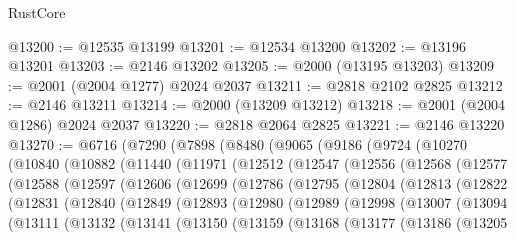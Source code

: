 \begin{lexlean}{RustCore}
\begin{coremodule}
@13200 := @12535 @13199
@13201 := @12534 @13200
@13202 := @13196 @13201
@13203 := @2146 @13202
@13205 := @2000 (@13195 @13203)
@13209 := @2001 (@2004 @1277) @2024 @2037
@13211 := @2818 @2102 @2825
@13212 := @2146 @13211
@13214 := @2000 (@13209 @13212)
@13218 := @2001 (@2004 @1286) @2024 @2037
@13220 := @2818 @2064 @2825
@13221 := @2146 @13220
@13270 := @6716
    (@7290
      (@7898
        (@8480
          (@9065
            (@9186
              (@9724
                (@10270
                  (@10840
                    (@10882
                      (@11440
                        (@11971
                          (@12512
                            (@12547
                              (@12556
                                (@12568
                                  (@12577
                                    (@12588
                                      (@12597
                                        (@12606
                                          (@12699
                                            (@12786
                                              (@12795
                                                (@12804
                                                  (@12813
                                                    (@12822
                                                      (@12831
                                                        (@12840
                                                          (@12849
                                                            (@12893
                                                              (@12980
                                                                (@12989
                                                                  (@12998
                                                                    (@13007
                                                                      (@13094
                                                                        (@13111
                                                                          (@13132
                                                                            (@13141
                                                                              (@13150
                                                                                (@13159
                                                                                  (@13168
                                                                                    (@13177
                                                                                      (@13186
                                                                                        (@13205

\end{coremodule}
\end{lexlean}
